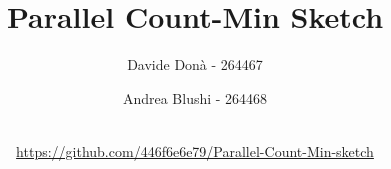 \documentclass{article}
\title{Parallel Count-Min Sketch}
\author{Davide Donà - 264467 \and
 Andrea Blushi - 264468}
\date{\MonthName\ \number\year \\[0.5em]
\small\textcolor{gray}{\href{https://github.com/446f6e6e79/Parallel-Count-Min-sketch}{https://github.com/446f6e6e79/Parallel-Count-Min-sketch}}
}
\begin{document}
\maketitle
\newpage
\tableofcontents

\newpage






\newpage
\nocite{*}


\end{document}

